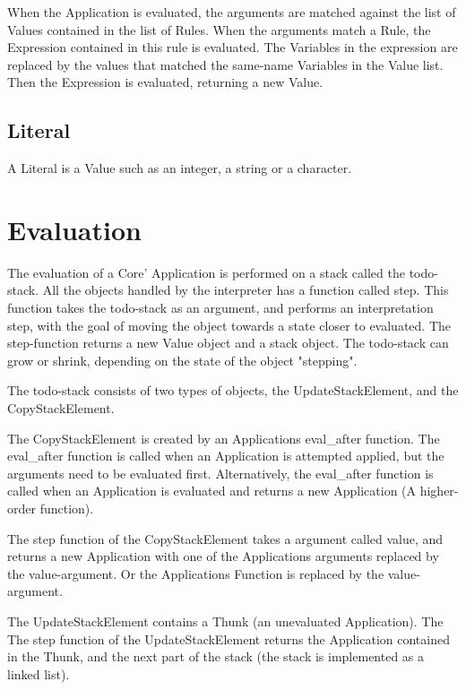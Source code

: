 When the Application is evaluated, the arguments are matched against the list of 
Values contained in the list of Rules. 
When the arguments match a Rule, the Expression contained in this rule is evaluated. 
The Variables in the expression are replaced by the values that matched the same-name
Variables in the Value list. Then the Expression is evaluated, returning a new Value.

\subsection{Literal}
A Literal is a Value such as an integer, a string or a character.





\section{Evaluation}

The evaluation of a Core' Application is performed on a stack called the
todo-stack. All the objects handled by the interpreter has a function called
step. This function takes the todo-stack as an argument, and performs an
interpretation step, with the goal of moving the object towards a state
closer to evaluated. The step-function returns a new Value object and a
stack object. The todo-stack can grow or shrink, depending on the state of
the object "stepping".

The todo-stack consists of two types of objects, the UpdateStackElement,
and the CopyStackElement. 

The CopyStackElement is created by an Applications eval\_after function. The
eval\_after function is called when an Application is attempted applied, but
the arguments need to be evaluated first. Alternatively, the eval\_after
function is called when an Application is evaluated and returns a new
Application (A higher-order function). 

The step function of the CopyStackElement takes a argument called value,
and returns a new Application with one of the Applications arguments
replaced by the value-argument. Or the Applications Function is replaced
by the value-argument.

The UpdateStackElement contains a Thunk (an unevaluated Application). The
The step function of the UpdateStackElement returns the Application contained
in the Thunk, and the next part of the stack (the stack is implemented as a
linked list).


